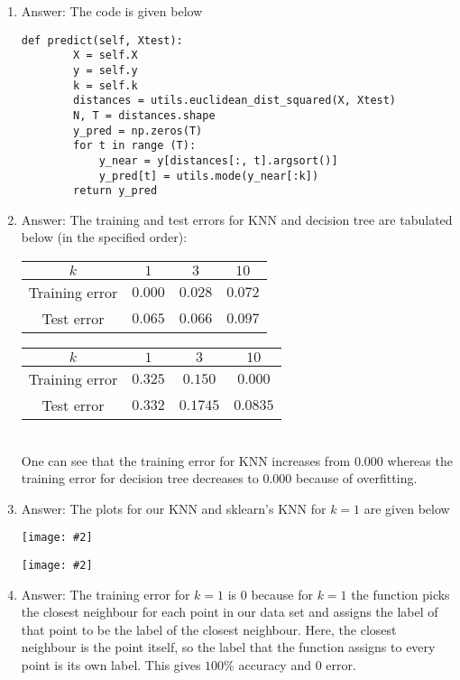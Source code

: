 \documentclass{article}
\def\gre#1{{\color{gre}#1}}
\newcommand{\centerfig}[2]{\begin{center}\texttt{[image: \#2]}\end{center}}
\def\ans#1{\gre{Answer: #1}}{}
\begin{document}
\begin{enumerate}
	\item \ans{The code is given below}
	
	\begin{lstlisting}[style=base]
	def predict(self, Xtest):
		X = self.X
		y = self.y
		k = self.k
		distances = utils.euclidean_dist_squared(X, Xtest)
		N, T = distances.shape
		y_pred = np.zeros(T)
		for t in range (T):
			y_near = y[distances[:, t].argsort()]
			y_pred[t] = utils.mode(y_near[:k])
		return y_pred
	\end{lstlisting}
	
	\item 
	\ans{The training and test errors for KNN and decision tree are tabulated below (in the specified order): \\
	\gre{
		\begin{tabular}{c|c|c|c}
		$k$ & $1$ & $3$ & $10$ \\ \hline
		Training error & $0.000$ & $0.028$ & $0.072$ \\ \hline
		Test error & $0.065$ & $0.066$ & $0.097$ \\ \hline 	
		\end{tabular}
	}
	\gre{
		\begin{tabular}{c|c|c|c}
			$k$ & $1$ & $3$ & $10$ \\ \hline
			Training error & $0.325$ & $0.150$ & $0.000$ \\ \hline
			Test error & $0.332$ & $0.1745$ & $0.0835$ \\ \hline 	
		\end{tabular}
	} \\
	One can see that the training error for KNN increases from $0.000$ whereas the training error for decision tree decreases to $0.000$ because of overfitting.}
	\item \ans{The plots for our KNN and sklearn's KNN for $k = 1$ are given below}
	\centerfig{.5}{../figs/q3_our_KNN.pdf}
	
	\centerfig{.5}{../figs/q3_sklearn_KNN.pdf}
	 
	\item \ans{The training error for $k = 1$ is $0$ because for $k = 1$ the function picks the closest neighbour for each point in our data set and assigns the label of that point to be the label of the closest neighbour. Here, the closest neighbour is the point itself, so the label that the function assigns to every point is its own label. This gives $100\%$ accuracy and $0$ error.}
\end{enumerate}
\end{document}
